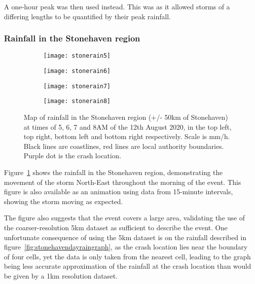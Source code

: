A one-hour peak was then used instead.
This was as it allowed storms of a differing lengths to be quantified by their peak rainfall.

\subsubsection{Rainfall in the Stonehaven region}

\begin{figure}[H]
    \centering

    \begin{subfigure}{0.48\textwidth}
        \centering
        \texttt{[image: stonerain5]}
    \end{subfigure}
    \hfill
    \begin{subfigure}{0.48\textwidth}
        \centering
        \texttt{[image: stonerain6]}
    \end{subfigure}

    \vspace{\baselineskip}

    \begin{subfigure}{0.48\textwidth}
        \centering
        \texttt{[image: stonerain7]}
    \end{subfigure}
    \hfill
    \begin{subfigure}{0.48\textwidth}
        \centering
        \texttt{[image: stonerain8]}
    \end{subfigure}
    \caption[Map of rainfall in the Stonehaven region at times in the morning of 12th August 2020.]{
        Map of rainfall in the Stonehaven region (+/- 50km of Stonehaven)
        at times of 5, 6, 7 and 8AM of the 12th August 2020,
        in the top left, top right, bottom left and bottom right respectively.
    Scale is mm/h.
    Black lines are coastlines, red lines are local authority boundaries.
    Purple dot is the crash location.}
    \label{fig:stoneregionrain}
\end{figure}

Figure~\ref{fig:stoneregionrain} shows the rainfall in the Stonehaven region,
    demonstrating the movement of the storm North-East throughout the morning of the event.
This figure is also available as an animation using data from 15-minute intervals,
    showing the storm moving as expected.

The figure also suggests that the event covers a large area,
    validating the use of the coarser-resolution 5km dataset as sufficient to describe the event.
One unfortunate consequence of using the 5km dataset is on the rainfall described in figure~\ref{fig:stonehavendayraingraph},
    as the crash location lies near the boundary of four cells, yet the data is only taken from the nearest cell,
    leading to the graph being less accurate approximation of the rainfall at the crash location than would be given by a 1km resolution dataset.

